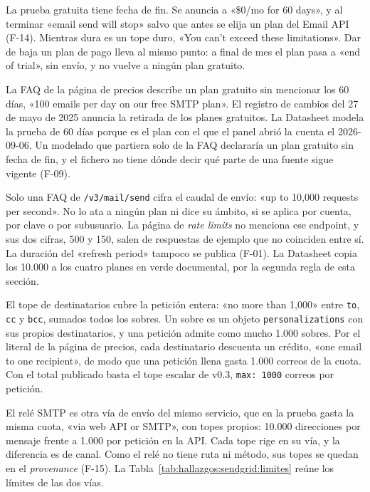 La prueba gratuita tiene fecha de fin. Se anuncia a «\$0/mo for 60 days», y al
terminar «email send will stop» salvo que antes se elija un plan del Email API
(F-14). Mientras dura es un tope duro, «You can’t exceed these limitations».
Dar de baja un plan de pago lleva al mismo punto: a final de mes el plan pasa
a «end of trial», sin envío, y no vuelve a ningún plan gratuito.

La FAQ de la página de precios describe un plan gratuito sin mencionar los 60
días, «100 emails per day on our free SMTP plan». El registro de cambios del
27 de mayo de 2025 anuncia la retirada de los planes gratuitos. La Datasheet modela la
prueba de 60 días porque es el plan con el que el panel abrió la cuenta el
2026-09-06. Un modelado que partiera solo de la FAQ declararía un plan
gratuito sin fecha de fin, y el fichero no tiene dónde decir qué parte de una
fuente sigue vigente (F-09).

Solo una FAQ de \texttt{/v3/mail/send} cifra el caudal de envío: «up to
10,000 requests per second». No lo ata a ningún plan ni dice su ámbito, si se
aplica por cuenta, por clave o por subusuario. La página de \textit{rate
limits} no menciona ese endpoint, y sus dos cifras, 500 y 150, salen de
respuestas de ejemplo que no coinciden entre sí. La duración del «refresh
period» tampoco se publica (F-01). La Datasheet copia los 10.000 a los cuatro
planes en verde documental, por la segunda regla de esta sección.

El tope de destinatarios cubre la petición entera: «no more than 1,000» entre
\texttt{to}, \texttt{cc} y \texttt{bcc}, sumados todos los sobres. Un sobre es
un objeto \texttt{personalizations} con sus propios destinatarios, y una
petición admite como mucho 1.000 sobres. Por el literal de la página de precios, cada
destinatario descuenta un crédito, «one email to one recipient», de modo que
una petición llena gasta 1.000 correos de la cuota. Con el total publicado
basta el tope escalar de v0.3, \texttt{max: 1000} correos por petición.

El relé SMTP es otra vía de envío del mismo servicio, que en la prueba gasta la
misma cuota, «via web API or SMTP», con topes propios: 10.000 direcciones por
mensaje frente a 1.000 por petición en la API. Cada tope rige en su vía, y la
diferencia es de canal. Como el relé no tiene ruta ni método, sus topes se
quedan en el \textit{provenance} (F-15).
La Tabla~\ref{tab:hallazgos:sendgrid:limites} reúne los límites de las dos vías.

